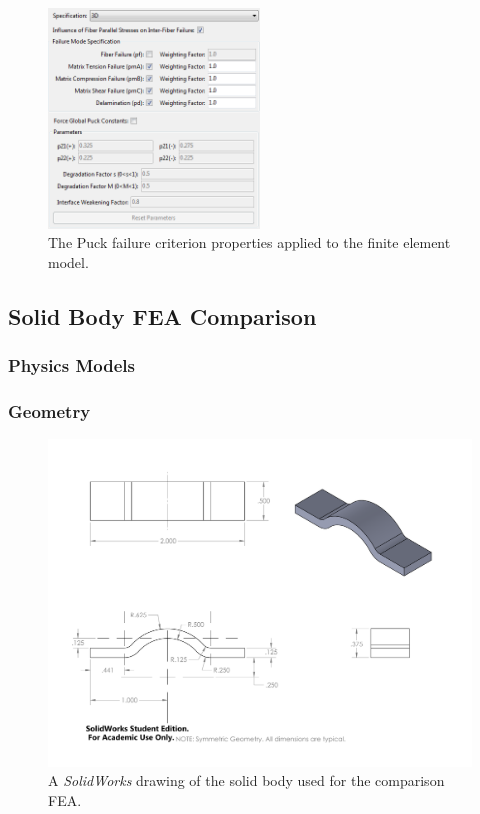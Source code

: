 \begin{figure}[htp]
\centering
\includegraphics[width=0.5\textwidth]{./figures/fea/fea-acp-puck-failure-criterion}
\caption{The Puck failure criterion properties applied to the finite element model.}
\label{fig:fea-acp-puck-failure-criterion}
\end{figure}

\clearpage

\subsection{Solid Body FEA Comparison}

\subsubsection{Physics Models}

\clearpage

\subsubsection{Geometry}

\begin{figure}[htp]
\centering
\includegraphics[width=1\textwidth]{./figures/fea/fea-body-geometry}
\caption{A \emph{SolidWorks} drawing of the solid body used for the comparison FEA.}
\label{fig:fea-acp-puck-failure-criterion}
\end{figure}

